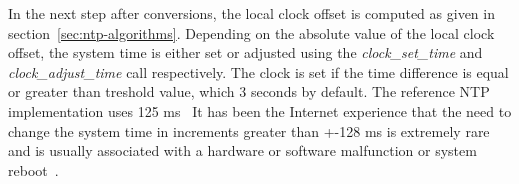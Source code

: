 In the next step after conversions, the local clock offset is computed
as given in section~\ref{sec:ntp-algorithms}.
Depending on the absolute value of the local clock offset,
the system time is either set or adjusted using the {\it{clock\_set\_time}}
and {\it{clock\_adjust\_time}} call respectively.
The clock is set if the time difference is equal or greater than
treshold value, which 3 seconds by default. %
The reference NTP implementation uses 125 ms~\cite{rfc5905}
It has been the Internet
experience that the need to change the system time in increments
greater than +-128 ms is extremely rare and is usually associated
with a hardware or software malfunction or system reboot~\cite{rfc1589}.
